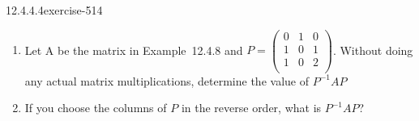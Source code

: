 \documentclass[twoside,10pt,]{book}
\numberwithin{equation}{section}
\begin{document}
\begin{divisionsolution}{12.4.4.4}{}{exercise-514}%
\hypertarget{p-4630}{}%
\leavevmode%
\begin{enumerate}[label=(\alph*)]
\item\hypertarget{li-2110}{}\hypertarget{p-4631}{}%
Let A be the matrix in Example~12.4.8 and \(P=\left(
\begin{array}{ccc}
0 & 1 & 0 \\
1 & 0 & 1 \\
1 & 0 & 2 \\
\end{array}
\right)\).  Without doing any actual matrix multiplications, determine the value of \(P^{-1} A P\)%
\item\hypertarget{li-2111}{}\hypertarget{p-4632}{}%
If you choose the columns of \(P\) in the reverse order, what is \(P^{-1} A P\)?%
\end{enumerate}
%
\end{divisionsolution}%
\end{document}
